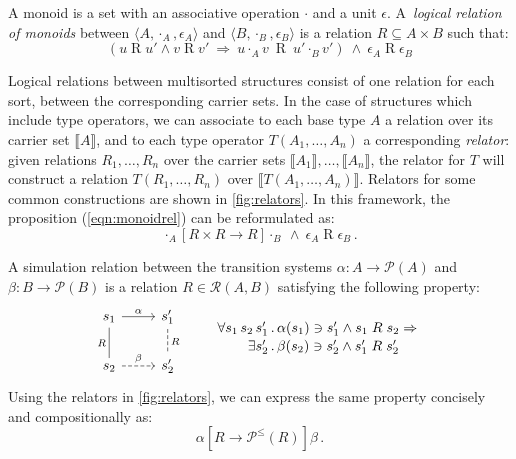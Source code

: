 \documentclass[sigplan,screen,review]{acmart}
\newcommand{\ifr}[1]{\mathrel{[{#1}]}}
\begin{document}
\begin{example}%
\label{ex:monoid}
A monoid is a set with
an associative operation $\cdot$ and
a unit $\epsilon$.
A~\emph{logical relation of monoids} between
$\langle A, \cdot_A, \epsilon_A \rangle$ and
$\langle B, \cdot_B, \epsilon_B \rangle$
is a relation $R \subseteq A \times B$
such that:
\begin{equation}
\label{eqn:monoidrel}
(u \mathrel{R} u' \wedge v \mathrel{R} v' \: \Rightarrow \:
 u \cdot_A v \: \mathrel{R} \: u' \cdot_B v')
\: \wedge \:
\epsilon_A \mathrel{R} \epsilon_B
\end{equation}
\end{example}

Logical relations between multisorted structures
consist of one relation for each sort,
between the corresponding carrier sets.
In the case of structures which include type operators,
we can associate to each base type $A$
a relation over its carrier set $\llbracket A \rrbracket$,
and to each type operator $T(A_1, \ldots, A_n)$
a corresponding \emph{relator}:
given relations $R_1, \ldots, R_n$ over
the carrier sets $\llbracket A_1 \rrbracket, \ldots, \llbracket A_n \rrbracket$,
the relator for $T$
will construct a relation $T(R_1, \ldots, R_n)$
over $\llbracket T(A_1, \ldots, A_n) \rrbracket$.
Relators for some common constructions are shown in \autoref{fig:relators}.
In this framework, the proposition (\ref{eqn:monoidrel}) can be reformulated as:
\[
  \cdot_A \ifr{R \times R \rightarrow R} \cdot_B
  \: \wedge \:
  \epsilon_A \mathrel{R} \epsilon_B \,.
\]

\begin{example} \label{ex:simrel} %
A simulation relation
between the transition systems
$\alpha : A \rightarrow \mathcal{P}(A)$ and
$\beta : B \rightarrow \mathcal{P}(B)$
is a relation $R \in \mathcal{R}(A, B)$
satisfying the following property:
\[
  \begin{tikzcd}[scale=0.8]
    s_1 \arrow[r, "\alpha"]
        \arrow[d, dash, "R"'] &
    s_1' \arrow[d, dashed, dash, "R"] \\
    s_2 \arrow[r, dashed, "\beta"] &
    s_2'
  \end{tikzcd}
  \qquad
  \label{eqn:simrel}
  \begin{array}{r@{\,.\,}l}
    \forall s_1 \, s_2 \, s_1' &
      \alpha(s_1) \ni s_1' \wedge s_1 \mathrel{R} s_2 \Rightarrow
    \\[0.25ex]
    \exists s_2' &
      \beta(s_2) \ni s_2' \wedge s_1' \mathrel{R} s_2'
  \end{array}
\]
Using the relators in \autoref{fig:relators},
we can express the same property
concisely and compositionally as:
\[
  \alpha \ifr{R \rightarrow \mathcal{P}^\le(R)} \beta \,.
\]
\end{example}
\end{document}
